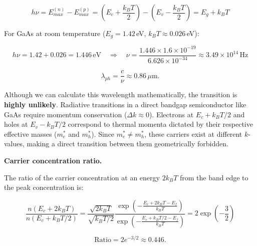 \begin{equation*}
  h\nu = E_{max}^{(n)} - E_{max}^{(p)} = \left(E_c + \frac{k_B T}{2}\right) - \left(E_v - \frac{k_B T}{2}\right) = E_g + k_B T
\end{equation*}

For GaAs at room temperature ($E_g = 1.42$\,eV, $k_B T \approx 0.026$\,eV):

\begin{equation*}
  h\nu = 1.42 + 0.026 = 1.446\,\text{eV} \quad\Longrightarrow\quad \nu = \frac{1.446 \times 1.6\times10^{-19}}{6.626\times10^{-34}} \approx 3.49 \times 10^{14}\,\text{Hz}
\end{equation*}

\begin{equation*}
  \boxed{\lambda_{ph} = \frac{c}{\nu} \approx 0.86\,\mu\text{m}.}
\end{equation*}

Although we can calculate this wavelength mathematically, the transition is \textbf{highly unlikely}. Radiative transitions in a direct bandgap semiconductor like GaAs require momentum conservation ($\Delta k \approx 0$). Electrons at $E_c + k_B T/2$ and holes at $E_v - k_B T/2$ correspond to thermal momenta dictated by their respective effective masses ($m_e^*$ and $m_h^*$). Since $m_e^* \neq m_h^*$, these carriers exist at different $k$-values, making a direct transition between them geometrically forbidden.

\textbf{Carrier concentration ratio.}

The ratio of the carrier concentration at an energy $2k_B T$ from the band edge to the peak concentration is:

\begin{equation*}
  \frac{n(E_c + 2k_B T)}{n(E_c + k_B T/2)} = \frac{\sqrt{2k_B T}}{\sqrt{k_B T/2}} \frac{\exp\left(-\frac{E_c + 2k_B T - E_f}{k_B T}\right)}{\exp\left(-\frac{E_c + k_B T/2 - E_f}{k_B T}\right)} = 2 \exp\left(-\frac{3}{2}\right)
\end{equation*}

\begin{equation*}
  \boxed{\text{Ratio} = 2 e^{-3/2} \approx 0.446.}
\end{equation*}

